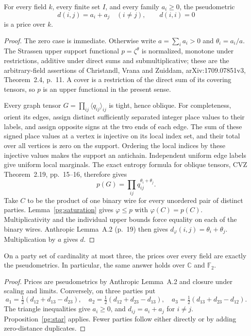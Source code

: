 \begin{proposition}
\label{pg:star}
For every field $k$, every finite set $I$, and every family $a_i\geq0$, the
pseudometric
\[
 d(i,j)=a_i+a_j\quad(i\ne j),\qquad d(i,i)=0
\]
is a price over $k$.
\end{proposition}
\begin{proof}
The zero case is immediate. Otherwise write $a=\sum_i a_i>0$ and
$\theta_i=a_i/a$. The Strassen upper support functional $p=\zeta^\theta$
is normalized, monotone under restrictions, additive under direct sums and
submultiplicative; these are the arbitrary-field assertions of Christandl,
Vrana and Zuiddam, arXiv:1709.07851v3, Theorem~2.4, p.~11.
A cover is a restriction of the direct sum of its covering tensors, so $p$
is an upper functional in the present sense.

Every graph tensor $G=\prod_{ij}\langle q_{ij}\rangle_{ij}$ is tight,
hence oblique. For completeness, orient its edges, assign distinct sufficiently
separated integer place values to their labels, and assign opposite signs at
the two ends of each edge. The sum of these signed place values at a vertex
is injective on its local index set, and their total over all vertices is zero
on the support. Ordering the local indices by these injective values makes
the support an antichain. Independent uniform edge labels give uniform local
marginals. The exact entropy formula for oblique tensors, CVZ
Theorem~2.19, pp.~15--16, therefore gives
\[
 p(G)=\prod_{ij}q_{ij}^{\theta_i+\theta_j}.
\]
Take $C$ to be the product of one binary wire for every unordered pair of
distinct parties. Lemma~\ref{pg:saturation} gives $\varphi\leq p$ with
$\varphi(C)=p(C)$. Multiplicativity and the individual upper bounds force
equality on each of the binary wires. Anthropic Lemma~A.2 (p.~19) then gives
$d_\varphi(i,j)=\theta_i+\theta_j$. Multiplication by $a$ gives $d$.
\end{proof}

\begin{theorem}
\label{pg:three}
On a party set of cardinality at most three, the prices over every field are
exactly the pseudometrics. In particular, the same answer holds over
$\mathbb C$ and $\mathbb F_2$.
\end{theorem}
\begin{proof}
Prices are pseudometrics by Anthropic Lemma~A.2 and closure under scaling and
limits. Conversely, on three parties put
\[
 a_1=\tfrac12(d_{12}+d_{13}-d_{23}),\quad
 a_2=\tfrac12(d_{12}+d_{23}-d_{13}),\quad
 a_3=\tfrac12(d_{13}+d_{23}-d_{12}).
\]
The triangle inequalities give $a_i\geq0$, and $d_{ij}=a_i+a_j$ for
$i\ne j$. Proposition~\ref{pg:star} applies. Fewer parties follow either
directly or by adding zero-distance duplicates.
\end{proof}

